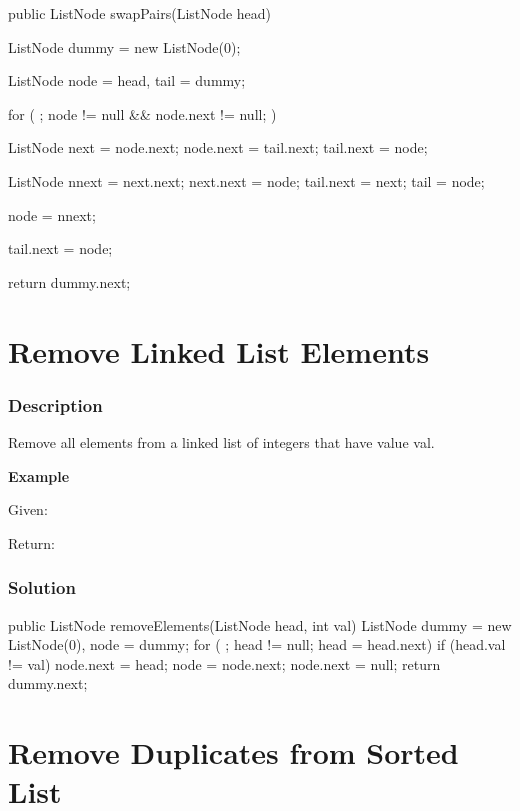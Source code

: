 \begin{Code}
public ListNode swapPairs(ListNode head) {
    ListNode dummy = new ListNode(0);

    ListNode node = head, tail = dummy;

    for ( ; node != null && node.next != null; ) {
        ListNode next = node.next;
        node.next = tail.next;
        tail.next = node;

        ListNode nnext = next.next;
        next.next = node;
        tail.next = next;
        tail = node;

        node = nnext;
    }

    tail.next = node;

    return dummy.next;
}
\end{Code}

\newpage

\section{Remove Linked List Elements} %

\subsubsection{Description}
Remove all elements from a linked list of integers that have value val.

\textbf{Example}

Given: 

Return: 

\subsubsection{Solution}

\begin{Code}
public ListNode removeElements(ListNode head, int val) {
    ListNode dummy = new ListNode(0), node = dummy;
    for ( ; head != null; head = head.next) {
        if (head.val != val) {
            node.next = head;
            node = node.next;
        }
    }
    node.next = null;
    return dummy.next;
}
\end{Code}

\newpage

\section{Remove Duplicates from Sorted List} %

